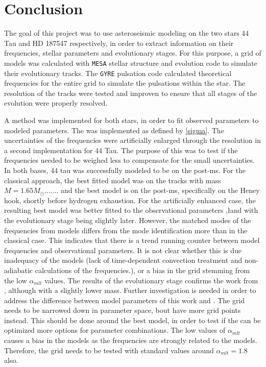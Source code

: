 \chapter{Conclusion}
\label{sec:conclusion}

The goal of this project was to use asteroseismic modeling on the two stars 44 Tau and HD 187547 respectively, in order to extract information on their frequencies, stellar parameters and evolutionary stages. For this purpose, a grid of models was calculated with \texttt{MESA} stellar structure and evolution code to simulate their evolutionary tracks. The \texttt{GYRE}  pulsation code calculated theoretical frequencies for the entire grid to simulate the pulsations within the star. The resolution of the tracks were tested and improven to ensure that all stages of the evolution were properly resolved. 

A \chis method was implemented for both stars, in order to fit observed parameters to modeled parameters.  The \chis was implemented as defined by \eqref{sigma}. The uncertainties of the frequencies were artificially enlarged through the resolution in a second \chis implementation for 44 Tau. The purpose of this was to test if the frequencies needed to be weighed less to compensate for the small uncertainties. In both bases, 44 tau was successfully modeled to be on the post-ms. For the classical \chis approach, the best fitted model was on the tracks with mass $M=1.65M_\odot$....... and the best model is on the post-ms, specifically on the Heney hook, shortly before hydrogen exhaustion. For the artificially enhanced case, the resulting best model was better fitted to the observational parameters \teff,\l and \logg with the evolutionary stage being slightly later. However, the matched modes of the frequencies from models differs from the mode identification more than in the classical case. This indicates that there is a trend running counter between model frequencies and observational parameters. It is not clear whether this is due inadequacy of the models (lack of time-dependent convection treatment and non-adiabatic calculations of the frequencies.), or a bias in the grid stemming from the low $\alpha_{mlt}$ values. 
The results of the evolutionary stage confirms the work from \citet{lenz2010delta}, although with a slightly lower mass. Further investigation is needed in order to address the difference between model parameters of this work and \citet{lenz2010delta}. The grid needs to be narrowed down in parameter space, bout have more grid points instead. This should be done around the best model, in order to test if the \chis can be optimized more options for parameter combinations. The low values of $\alpha_{mlt}$ causes a bias in the models as the frequencies are strongly related to the models. Therefore, the grid needs to be tested with standard values around $\alpha_{mlt}=1.8$ also. 

